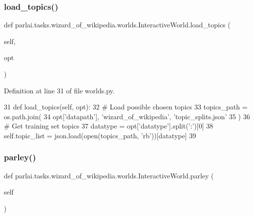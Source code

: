 \subsubsection{\texorpdfstring{load\+\_\+topics()}{load\_topics()}}
{\footnotesize\ttfamily def parlai.\+tasks.\+wizard\+\_\+of\+\_\+wikipedia.\+worlds.\+Interactive\+World.\+load\+\_\+topics (\begin{DoxyParamCaption}\item[{}]{self,  }\item[{}]{opt }\end{DoxyParamCaption})}



Definition at line 31 of file worlds.\+py.


\begin{DoxyCode}
31     \textcolor{keyword}{def }load\_topics(self, opt):
32         \textcolor{comment}{# Load possible chosen topics}
33         topics\_path = os.path.join(
34             opt[\textcolor{stringliteral}{'datapath'}], \textcolor{stringliteral}{'wizard\_of\_wikipedia'}, \textcolor{stringliteral}{'topic\_splits.json'}
35         )
36         \textcolor{comment}{# Get training set topics}
37         datatype = opt[\textcolor{stringliteral}{'datatype'}].split(\textcolor{stringliteral}{':'})[0]
38         self.topic\_list = json.load(open(topics\_path, \textcolor{stringliteral}{'rb'}))[datatype]
39 
\end{DoxyCode}
\mbox{\label{classparlai_1_1tasks_1_1wizard__of__wikipedia_1_1worlds_1_1InteractiveWorld_afcda29202fc3fd773522edbd3c40e4a4}} 
\subsubsection{\texorpdfstring{parley()}{parley()}}
{\footnotesize\ttfamily def parlai.\+tasks.\+wizard\+\_\+of\+\_\+wikipedia.\+worlds.\+Interactive\+World.\+parley (\begin{DoxyParamCaption}\item[{}]{self }\end{DoxyParamCaption})}



